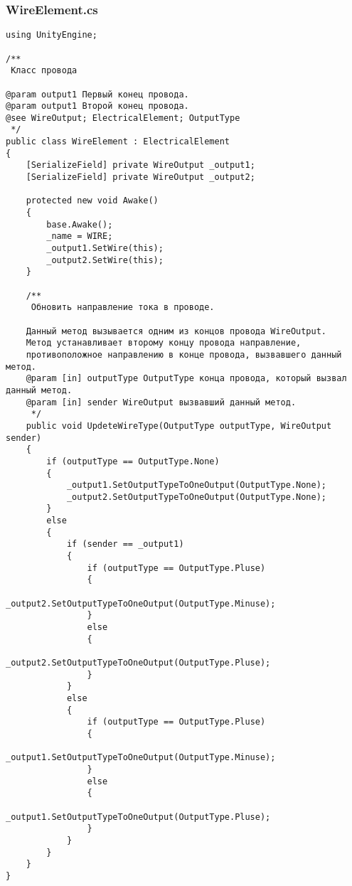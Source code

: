 \begin{verbatim}
\end{verbatim}
\subsubsection*{WireElement.cs}
\begin{verbatim}
﻿using UnityEngine;

/**
 Класс провода

@param output1 Первый конец провода.
@param output1 Второй конец провода.
@see WireOutput; ElectricalElement; OutputType
 */
public class WireElement : ElectricalElement
{
    [SerializeField] private WireOutput _output1;
    [SerializeField] private WireOutput _output2;

    protected new void Awake()
    {
        base.Awake();
        _name = WIRE;
        _output1.SetWire(this);
        _output2.SetWire(this);
    }

    /**
     Обновить направление тока в проводе.

    Данный метод вызывается одним из концов провода WireOutput.
    Метод устанавливает второму концу провода направление, 
    противоположное направлению в конце провода, вызвавшего данный метод.
    @param [in] outputType OutputType конца провода, который вызвал данный метод.
    @param [in] sender WireOutput вызвавший данный метод.
     */
    public void UpdeteWireType(OutputType outputType, WireOutput sender)
    {
        if (outputType == OutputType.None)
        {
            _output1.SetOutputTypeToOneOutput(OutputType.None);
            _output2.SetOutputTypeToOneOutput(OutputType.None);
        }
        else
        {
            if (sender == _output1)
            {
                if (outputType == OutputType.Pluse)
                {
                    _output2.SetOutputTypeToOneOutput(OutputType.Minuse);
                }
                else
                {
                    _output2.SetOutputTypeToOneOutput(OutputType.Pluse);
                }
            }
            else
            {
                if (outputType == OutputType.Pluse)
                {
                    _output1.SetOutputTypeToOneOutput(OutputType.Minuse);
                }
                else
                {
                    _output1.SetOutputTypeToOneOutput(OutputType.Pluse);
                }
            }
        }
    }
}

\end{verbatim}
